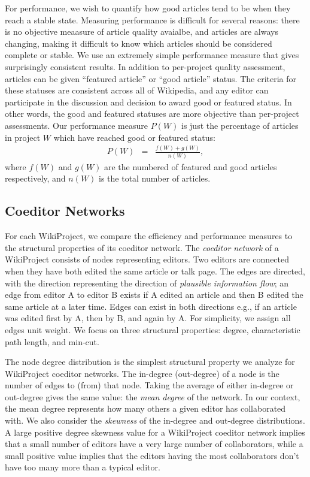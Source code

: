 \documentclass[10pt,twocolumn]{article}
\newcommand{\beq}{\begin{eqnarray}}
\newcommand{\eeq}{\end{eqnarray}}
\begin{document}
For performance, we wish to quantify how good articles tend to be when they reach a stable state.
Measuring performance is difficult for several reasons:
there is no objective meaasure of article quality avaialbe,
and articles are always changing, making it difficult to know which articles should be considered
complete or stable.
We use an extremely simple performance measure that gives surprisingly consistent results.
In addition to per-project quality assessment, articles can be given ``featured article'' or
``good article'' status.
The criteria for these statuses are consistent across all of Wikipedia,
and any editor can participate in the discussion and decision to award good or featured
status.
In other words, the good and featured statuses are more objective than per-project assessments.
Our performance measure $P(W)$ is just the percentage of articles in project $W$ which have reached
good or featured status:
\beq
P(W) &=& \frac{f(W) + g(W)}{n(W)},
\eeq
where $f(W)$ and $g(W)$ are the numbered of featured and good articles respectively,
and $n(W)$ is the total number of articles.

\subsection{Coeditor Networks}

For each WikiProject, we compare the efficiency and performance measures to the structural
properties of its coeditor network.
The {\em coeditor network} of a WikiProject consists of nodes representing editors.
Two editors are connected when they have both edited the same article or talk page.
The edges are directed, with the direction representing the direction of
{\em plausible information flow};
an edge from editor A to editor B exists if A edited an article and then B edited the same article at
a later time.
Edges can exist in both directions e.g., if an article was edited first by A, then by B, and again by A.
For simplicity, we assign all edges unit weight.
We focus on three structural properties: degree, characteristic path length, and min-cut.

The node degree distribution is the simplest structural property we analyze for WikiProject
coeditor networks.
The in-degree (out-degree) of a node is the number of edges to (from) that node.
Taking the average of either in-degree or out-degree gives the same value:
the {\em mean degree} of the network.
In our context, the mean degree represents how many others a given editor has collaborated with.
We also consider the {\em skewness} of the in-degree and out-degree distributions.
A large positive degree skewness value for a WikiProject coeditor network
implies that a small number of editors have a very large number of collaborators,
while a small positive value implies that the editors having the most collaborators
don't have too many more than a typical editor.
\end{document}
